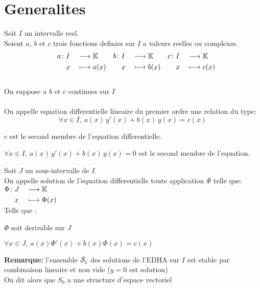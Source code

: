 \documentclass[12pt,twoside,a4paper]{article}
\author{MPSI 2}
\begin{document}
	\maketitle
	\section{Generalites}
		\begin{defi}
			Soit $I$ un intervalle reel.\\
			Soient $a$, $b$ et $c$ trois fonctions definies sur $I$ a valeurs reelles ou complexes.\\
			$$\begin{aligned}&&\begin{aligned}[t]a\colon&I&&\longrightarrow\mathbb{K} \\&x&&\longmapsto a(x)\end{aligned} &&\begin{aligned}[t]b\colon&I&&\longrightarrow\mathbb{K} \\&x&&\longmapsto b(x)\end{aligned} &&\begin{aligned}[t]c\colon&I&&\longrightarrow\mathbb{K} \\&x&&\longmapsto c(x)\end{aligned} \end{aligned}$$\\
			On suppose $a$ $b$ et $c$ continues sur $I$\\
			\\
			On appelle equation differentielle lineaire du premier ordre une relation du type:\\
			$$\forall x\in I,\ a(x)\,y'(x)+b(x)\,y(x)=c(x)$$
		\end{defi}
		\begin{defi}
			\begin{liste}
				\item $c$ est le second membre de l'equation differentielle.
				\item $\forall x\in I,\ a(x)\,y'(x)+b(x)\,y(x)=0$ est le second membre de l'equation.
			\end{liste}
		\end{defi}
		\begin{defi}
			Soit $J$ un sous-intervalle de $I$.\\
			On appelle solution de l'equation differentielle toute application $\Phi$ telle que:\\
			$\begin{aligned}[t]\Phi\colon&J&&\longrightarrow\mathbb{K} \\&x&&\longmapsto\Phi(x)\end{aligned}$\\
			Telle que :\begin{liste}
							\item $\Phi$ soit derivable sur $J$
							\item $\forall x\in J,\ a(x)\Phi'(x)+b(x)\Phi(x)=c(x)$
							\end{liste}
		\end{defi}
		\textbf{Remarque:} l'ensemble $\mathcal{S}_{_{0}}$ des solutions de l'EDHA sur $I$ est stable par combinaison lineaire et non vide ($y=0$ est solution)\\
		On dit alors que $S_0$ a une structure d'espace vectoriel
\end{document}
